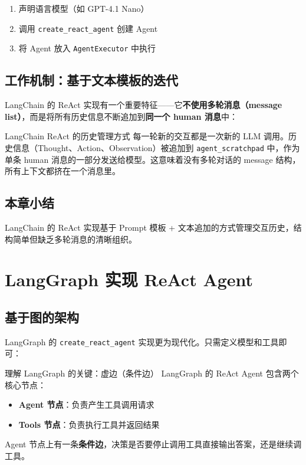 \documentclass[a4paper]{article}
\begin{document}
\begin{enumerate}
    \item 声明语言模型（如 GPT-4.1 Nano）
    \item 调用 \texttt{create\_react\_agent} 创建 Agent
    \item 将 Agent 放入 \texttt{AgentExecutor} 中执行
\end{enumerate}

\subsection{工作机制：基于文本模板的迭代}

LangChain 的 ReAct 实现有一个重要特征——它\textbf{不使用多轮消息（message list）}，而是将所有历史信息不断追加到\textbf{同一个 human 消息}中：

\begin{warningbox}{LangChain ReAct 的历史管理方式}
每一轮新的交互都是一次新的 LLM 调用。历史信息（Thought、Action、Observation）被追加到 \texttt{agent\_scratchpad} 中，作为单条 human 消息的一部分发送给模型。这意味着没有多轮对话的 message 结构，所有上下文都挤在一个消息里。
\end{warningbox}

\subsection{本章小结}
LangChain 的 ReAct 实现基于 Prompt 模板 + 文本追加的方式管理交互历史，结构简单但缺乏多轮消息的清晰组织。

\section{LangGraph 实现 ReAct Agent}

\subsection{基于图的架构}

LangGraph 的 \texttt{create\_react\_agent} 实现更为现代化。只需定义模型和工具即可：

\begin{importantbox}{理解 LangGraph 的关键：虚边（条件边）}
LangGraph 的 ReAct Agent 包含两个核心节点：
\begin{itemize}
    \item \textbf{Agent 节点}：负责产生工具调用请求
    \item \textbf{Tools 节点}：负责执行工具并返回结果
\end{itemize}
Agent 节点上有一条\textbf{条件边}，决策是否要停止调用工具直接输出答案，还是继续调工具。
\end{importantbox}
\end{document}

